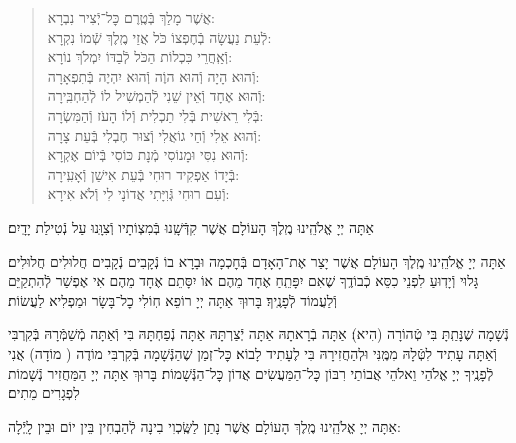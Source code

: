 \documentclass[twoside, openany, parskip=half, 11pt]{book}
\begin{document}
\begin{quote}

אֲשֶׁר מָלַךְ \hfill בְּֿטֶֽרֶם כׇּל־יְֿצִיר נִבְרָא: \\
לְֿעֵת נַעֲשָׂה בְֿחֶפְצוֹ כֹּל \hfill אֲזַי מֶֽלֶךְ שְֿׁמוֹ נִקְרָא:\\
וְֿאַֽחֲרֵי כִּכְלוֹת הַכֹּל \hfill לְֿבַדּוֹ יִמְלֹךְ נוֹרָא: \\
וְֿהוּא הָיָה וְֿהוּא הוֶֹה \hfill וְֿהוּא יִהְיֶה בְּֿתִפְאָרָה: \\
וְֿהוּא אֶחָד וְֿאֵין שֵׁנִי \hfill לְֿהַמְשִׁיל לוֹ לְֿהַחְבִּֽירָה: \\
בְּֿלִי רֵאשִׁית בְּֿלִי תַכְלִית \hfill וְֿלוֹ הָעֹז וְֿהַמִּשְׂרָה: \\
וְֿהוּא אֵלִי וְֿחַי גוֹאֲלִי \hfill וְֿצוּר חֶבְלִי בְּֿעֵת צָרָה: \\
וְֿהוּא נִסִּי וּמָנוֹסִי \hfill מְֿנָת כּוֹסִי בְּֿיוֹם אֶקְרָא: \\
בְּֿיָדוֹ אַפְקִיד רוּחִי \hfill בְּֿעֵת אִישַׁן וְֿאָעִֽירָה: \\
וְֿעִם רוּחִי גְּֿוִיָּתִי \hfill אֲדוֹנָי לִי וְֿלֹא אִירָא:

\end{quote}

אַתָּה יְיָ אֱלֹהֵֽינוּ מֶֽלֶךְ הָעוֹלָם אֲשֶׁר קִדְּֿשָֽׁנוּ בְּֿמִצְוֹתָיו וְֿצִוָּֽנוּ עַל נְֿטִילַת יָדָֽיִם׃

אַתָּה יְיָ אֱלֹהֵֽינוּ מֶֽלֶךְ הָעוֹלָם אֲשֶׁר יָצַר אֶת־הָאָדָם בְּֿחׇכְמָה וּבָרָא בוֹ נְֿקָבִים נְֿקָבִים חֲלוּלִים חֲלוּלִים׃ גָּלוּי וְֿיָדֽוּעַ לִפְנֵי כִסֵּא כְֿבוֹדֶֽךָ שֶׁאִם יִפָּתֵֽחַ אֶחָד מֵהֶם אוֹ יִסָּתֵם אֶחָד מֵהֶם אִי אֶפְשַׁר לְֿהִתְקַיֵּם וְֿלַעֲמוֹד לְֿפָנֶֽיךָ׃ בָּרוּךְ אַתָּה יְיָ רוֹפֵא חֽוֹלִי כׇל־בָּשָׂר וּמַפְלִיא לַעֲשׂוֹת׃


נְֿשָׁמָה שֶׁנָּתַֽתָּ בִּי טְֿהוֹרָה (הִיא)׃ אַתָּה בְֿרָאתָהּ אַתָּה יְֿצַרְתָּהּ אַתָּה נְֿפַחְתָּהּ בִּי וְֿאַתָּה מְֿשַׁמְּֿרָהּ בְּֿקִרְבִּי וְֿאַתָּה עָתִיד לִטְּֿלָהּ מִמֶּֽנִּי וּלְהַחֲזִירָהּ בִּי לֶעָתִיד לָבוֹא׃ כׇּל־זְמַן שֶׁהַנְּֿשָׁמָה בְּֿקִרְבִּי מוֹדֶה (
מוֹדָה) אֲנִי לְֿפָנֶֽיךָ יְיָ אֱלֹהַי וֵאלֹהֵי אֲבוֹתַי רִבּוֹן כׇּל־הַמַּעֲשִׂים אֲדוֹן כׇּל־הַנְּֿשָׁמוֹת׃ בָּרוּךְ אַתָּה יְיָ הַמַּחֲזִיר נְֿשָׁמוֹת לִפְגָרִים מֵתִים׃


אַתָּה יְיָ אֱלֹהֵֽינוּ מֶֽלֶךְ הָעוֹלָם אֲשֶׁר נָתַן לַשֶּֽׂכְוִי בִינָה לְֿהַבְחִין בֵּין יוֹם וּבֵין לָֽיְֿלָה:
\end{document}
